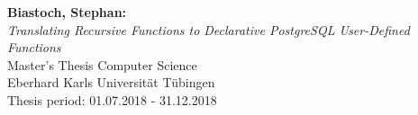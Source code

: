 \documentclass[twoside,10pt,a4paper]{report}
\begin{document}

\thispagestyle{empty}
\vspace*{\fill}
\begin{minipage}{11.2cm}
\textbf{Biastoch, Stephan:}\\
\emph{Translating Recursive Functions to Declarative PostgreSQL User-Defined Functions}\\ Master's Thesis Computer Science\\
Eberhard Karls Universität Tübingen\\
Thesis period: 01.07.2018 - 31.12.2018
\end{minipage}
\newpage


\setcounter{page}{1}





%
\newpage


\renewcommand{\baselinestretch}{1.3}
\small\normalsize

\tableofcontents

\renewcommand{\baselinestretch}{1}
\small\normalsize

\cleardoublepage






\end{document}
